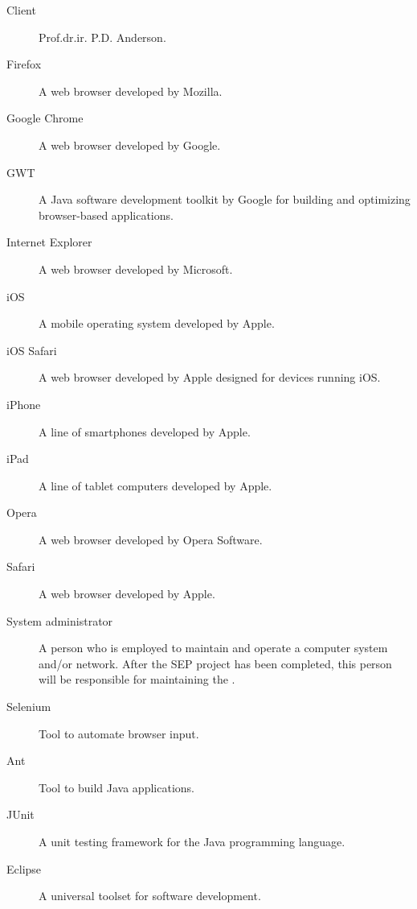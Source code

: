 \begin{description}


\item[Client] Prof.dr.ir. P.D. Anderson.
\item[Firefox] A web browser developed by Mozilla.
\item[Google Chrome] A web browser developed by Google.
\item[GWT] A Java software development toolkit by Google for building and optimizing browser-based applications.
\item[Internet Explorer] A web browser developed by Microsoft.
\item[iOS] A mobile operating system developed by Apple.
\item[iOS Safari] A web browser developed by Apple designed for devices running iOS.
\item[iPhone] A line of smartphones developed by Apple.
\item[iPad] A line of tablet computers developed by Apple.
\item[Opera] A web browser developed by Opera Software.
\item[Safari] A web browser developed by Apple.
\item[System administrator] A person who is employed to maintain and operate a computer system and/or network. After the SEP project has been completed, this person will be responsible for maintaining the \applicationname{}.
\item[Selenium] Tool to automate browser input.
\item[Ant] Tool to build Java applications.
\item[JUnit] A unit testing framework for the Java programming language.
\item[Eclipse] A universal toolset for software development.
\end{description}

